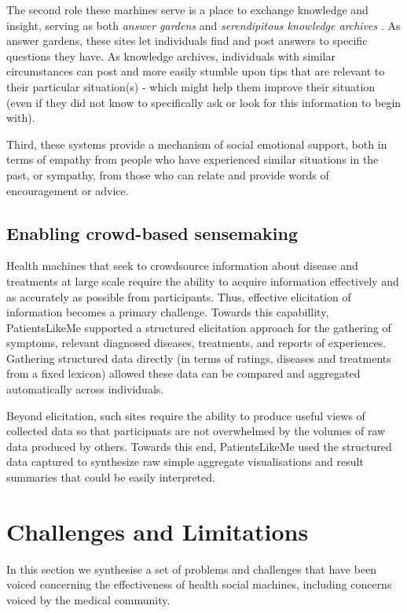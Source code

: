 \documentclass{sig-alternate}
\begin{document}
The second role these marhines serve is a place to exchange knowledge
and insight, serving as both \emph{answer gardens} \cite{answergarden}
and \emph{serendipitous knowledge archives} \cite{knowledgearchive}.
As answer gardens, these sites let individuals find and post answers
to specific questions they have.  As knowledge archives, individuals
with similar circumstances can post and more easily stumble upon tips
that are relevant to their particular situation(s) - which might help
them improve their situation (even if they did not know to
specifically ask or look for this information to begin with).

Third, these systems provide a mechanism of social emotional support,
both in terms of empathy from people who have experienced similar
situations in the past, or sympathy, from those who can relate and
provide words of encouragement or advice.

\subsection{Enabling crowd-based sensemaking}

Health machines that seek to crowdsource information about disease and
treatments at large scale require the ability to acquire information
effectively and as accurately as possible from participants.  Thus,
effective elicitation of information becomes a primary challenge.
Towards this capabillity, PatientsLikeMe supported a structured
elicitation approach for the gathering of symptoms, relevant diagnosed
diseases, treatments, and reports of experiences.  Gathering
structured data directly (in terms of ratings, diseases and treatments
from a fixed lexicon) allowed these data can be compared and
aggregated automatically across individuals.  

Beyond elicitation, such sites require the ability to produce useful
views of collected data so that participnats are not overwhelmed by
the volumes of raw data produced by others.  Towards this end,
PatientsLikeMe used the structured data captured to synthesize raw
simple aggregate visualisations and result summaries that could be
easily interpreted.

\section{Challenges and Limitations}

In this section we synthesise a set of problems and challenges that
have been voiced concerning the effectiveness of health social
machines, including concerns voiced by the medical community. 
\end{document}
